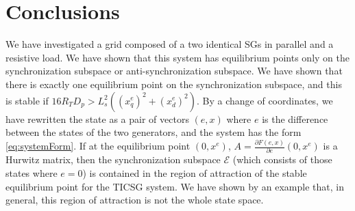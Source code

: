 \documentclass[letterpaper, 10 pt, conference]{ieeeconf}
\begin{document}
\section{Conclusions}

We have investigated a grid composed of a two identical SGs in
parallel and a resistive load. We have shown that this system has
equilibrium points only on the synchronization subspace or
anti-synchronization subspace. We have shown that there is exactly one
equilibrium point on the synchronization subspace, and this is stable
if $16 R_T D_p>L_s^2\left(\left(x_q^e\right)^2+\left(x_d^e\right)^2
\right)$. By a change of coordinates, we have rewritten the state as a
pair of vectors $(e,x)$ where $e$ is the difference between the states
of the two generators, and the system has the form 
\eqref{eq:systemForm}. If at the equilibrium point $(0,x^e)$,
$A=\frac{\partial F(e,x)}{\partial e}\left(0,x^e\right)$ is a Hurwitz
matrix, then the synchronization subspace $\mathscr{E}$ (which
consists of those states where $e=0$) is contained in the region of
attraction of the stable equilibrium point for the TICSG system. We
have shown by an example that, in general, this region of attraction
is not the whole state space.
\end{document}
